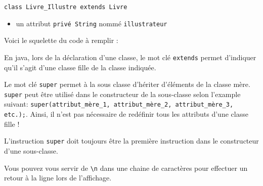 \begin{Exercice}[10 minutes]
\begin{itemize}
\end{itemize}
\lstinline{class Livre_Illustre extends Livre}
\begin{itemize}
	\item un attribut \lstinline{privé String} nommé \lstinline{illustrateur}

\end{itemize}

Voici le squelette du code à remplir : \\



\begin{conseil}
En java, lors de la déclaration d'une classe, le mot clé \lstinline{extends} permet d'indiquer qu'il s'agit d'une classe fille de la classe indiquée. 

Le mot clé \lstinline{super} permet à la sous classe d'hériter d'éléments de la classe mère. \lstinline{super} peut être utilisé dans le constructeur de la sous-classe selon l'example suivant: \lstinline{super(attribut_mère_1, attribut_mère_2, attribut_mère_3, etc.);}. Ainsi, il n'est pas nécessaire de redéfinir tous les attributs d'une classe fille !

L'instruction \lstinline{super} doit toujours être la première instruction dans le constructeur d'une sous-classe.

Vous pouvez vous servir de \lstinline{\n} dans une chaine de caractères pour effectuer un retour à la ligne lors de l'affichage.
\end{conseil}

\begin{solution}
	
\end{solution}

\end{Exercice}

